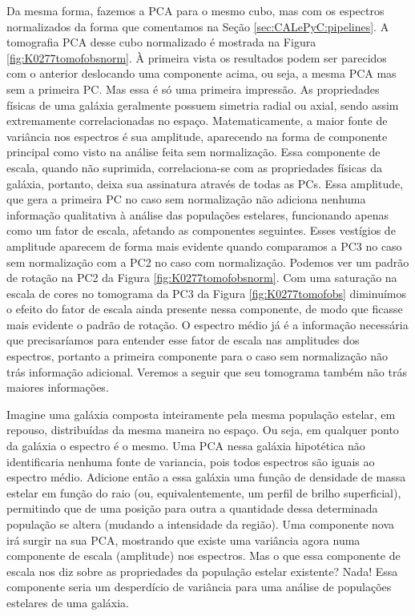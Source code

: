 Da mesma forma, fazemos a PCA para o mesmo cubo, mas com os espectros normalizados da forma que comentamos na Seção
\ref{sec:CALePyC:pipelines}. A tomografia PCA desse cubo normalizado é mostrada na Figura \ref{fig:K0277tomofobsnorm}.
À primeira vista os resultados podem ser parecidos com o anterior deslocando uma componente acima, ou seja, a mesma PCA
mas sem a primeira PC. Mas essa é só uma primeira impressão. As propriedades físicas de uma galáxia geralmente possuem
simetria radial ou axial, sendo assim extremamente correlacionadas no espaço. Matematicamente, a maior fonte de
variância nos espectros é sua amplitude, aparecendo na forma de componente principal como visto na análise feita sem
normalização. Essa componente de escala, quando não suprimida, correlaciona-se com as propriedades físicas da galáxia,
portanto, deixa sua assinatura através de todas as PCs. Essa amplitude, que gera a primeira PC no caso sem normalização
não adiciona nenhuma informação qualitativa à análise das populações estelares, funcionando apenas como um fator de
escala, afetando as componentes seguintes. Esses vestígios de amplitude aparecem de forma mais evidente quando
comparamos a PC3 no caso sem normalização com a PC2 no caso com normalização. Podemos ver um padrão de rotação na PC2 da
Figura \ref{fig:K0277tomofobsnorm}. Com uma saturação na escala de cores no tomograma da PC3 da Figura
\ref{fig:K0277tomofobs} diminuímos o efeito do fator de escala ainda presente nessa componente, de modo que ficasse mais
evidente o padrão de rotação. O espectro médio já é a informação necessária que precisaríamos para entender esse fator
de escala nas amplitudes dos espectros, portanto a primeira componente para o caso sem normalização não trás informação
adicional. Veremos a seguir que seu tomograma também não trás maiores informações.

Imagine uma galáxia composta inteiramente pela mesma população estelar, em repouso, distribuídas da mesma maneira no
espaço. Ou seja, em qualquer ponto da galáxia o espectro é o mesmo. Uma PCA nessa galáxia hipotética não identificaria
nenhuma fonte de variancia, pois todos espectros são iguais ao espectro médio. Adicione então a essa galáxia uma função
de densidade de massa estelar em função do raio (ou, equivalentemente, um perfil de brilho superficial), permitindo que
de uma posição para outra a quantidade dessa determinada população se altera (mudando a intensidade da região). Uma
componente nova irá surgir na sua PCA, mostrando que existe uma variância agora numa componente de escala (amplitude)
nos espectros. Mas o que essa componente de escala nos diz sobre as propriedades da população estelar existente? Nada!
Essa componente seria um desperdício de variância para uma análise de populações estelares de uma galáxia.

